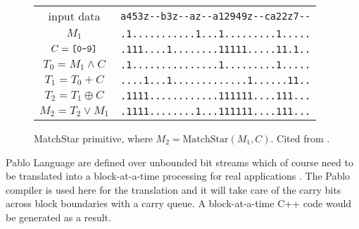 \begin{figure}[tbh]
\begin{center}
\begin{tabular}{cr}\\
input data  & \verb`a453z--b3z--az--a12949z--ca22z7--`\\
$M_1$ & \verb`.1...........1...1.........1.....`\\
$C = \text{\tt [0-9]}$ & \verb`.111....1........11111.....11.1..`\\
$T_0 = M_1 \wedge C$ & \verb`.1...............1.........1.....`\\
$T_1 = T_0 + C$ & \verb`....1...1.............1......11..`\\
$T_2 = T_1 \oplus C$ & \verb`.1111............111111....111...`\\
$M_2 = T_2 \vee M_1$ & \verb`.1111........1...111111....111...`
\end{tabular}
\end{center}
\caption[MatchStar Using Bitstream Addition and Mask]{MatchStar primitive, where $M_2 = \text{MatchStar}(M_1, C)$. Cited from \cite{rob_regex}.}
\label{figure:matchstar}
\end{figure}

Pablo Language are defined over unbounded bit streams which of course need to be translated into a block-at-a-time processing for real applications \cite{rob_regex}. The Pablo compiler is used here for the translation and it will take care of the carry bits across block boundaries with a carry queue. A block-at-a-time C++ code would be generated as a result.

